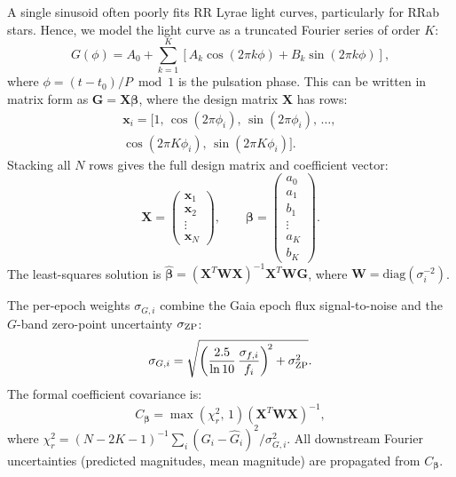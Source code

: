 \documentclass[10pt,preprint2]{aastex}
\begin{document}
A single sinusoid often poorly fits RR Lyrae light curves, particularly for RRab stars. Hence, we model the light curve as a truncated Fourier series of order $K$:
\begin{equation}
  G(\phi) = A_0 + \sum_{k=1}^{K} \left[ A_k \cos(2\pi k \phi) + B_k \sin(2\pi k \phi) \right],
\end{equation}
where $\phi = (t - t_0)/P \bmod 1$ is the pulsation phase. This can be written in matrix form as $\mathbf{G} = \mathbf{X}\boldsymbol{\beta}$, where the design matrix $\mathbf{X}$ has rows:
\begin{equation}
  \begin{split}
    \mathbf{x}_i = \bigl[ 1,\, \cos(2\pi\phi_i),\, \sin(2\pi\phi_i),\, \ldots,\, \\
      \cos(2\pi K\phi_i),\, \sin(2\pi K\phi_i) \bigr].
  \end{split}
\end{equation}
Stacking all $N$ rows gives the full design matrix and coefficient vector:
\begin{equation}
  \mathbf{X} = \begin{pmatrix} \mathbf{x}_1 \\ \mathbf{x}_2 \\ \vdots \\ \mathbf{x}_N \end{pmatrix}, \qquad
  \boldsymbol{\beta} = \begin{pmatrix} a_0 \\ a_1 \\ b_1 \\ \vdots \\ a_K \\ b_K \end{pmatrix}.
\end{equation}
The least-squares solution is $\hat{\boldsymbol{\beta}} = (\mathbf{X}^T \mathbf{W} \mathbf{X})^{-1} \mathbf{X}^T \mathbf{W} \mathbf{G}$, where $\mathbf{W} = \mathrm{diag}(\sigma_i^{-2})$.

The per-epoch weights $\sigma_{G,i}$ combine the Gaia epoch flux signal-to-noise and the $G$-band zero-point uncertainty $\sigma_{\rm ZP}$:
\begin{equation}
  \sigma_{G,i} = \sqrt{\left(\frac{2.5}{\ln 10}\,\frac{\sigma_{f,i}}{f_i}\right)^{\!2} + \sigma_{\rm ZP}^2}. \label{eq:sigma_G}
\end{equation}
The formal coefficient covariance is:
\begin{equation}
  C_{\boldsymbol{\beta}} = \max\!\left(\chi^2_r,\,1\right)(\mathbf{X}^T\mathbf{W}\mathbf{X})^{-1},
\end{equation}
where $\chi^2_r = (N - 2K - 1)^{-1}\sum_i (G_i - \hat{G}_i)^2/\sigma_{G,i}^2$. All downstream Fourier uncertainties (predicted magnitudes, mean magnitude) are propagated from $C_{\boldsymbol{\beta}}$.
\end{document}
